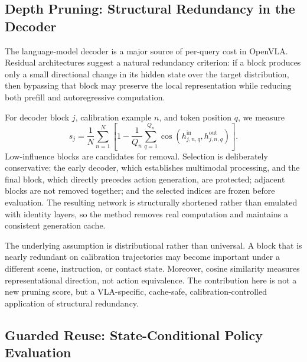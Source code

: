 \documentclass[letterpaper, 10 pt, conference]{ieeeconf}
\begin{document}
\subsection{Depth Pruning: Structural Redundancy in the Decoder}
\label{sec:method_depth_pruning}

The language-model decoder is a major source of per-query cost in OpenVLA.
Residual architectures suggest a natural redundancy criterion: if a block
produces only a small directional change in its hidden state over the target
distribution, then bypassing that block may preserve the local representation
while reducing both prefill and autoregressive computation.

For decoder block $j$, calibration example $n$, and token position $q$, we
measure
\begin{equation}
    s_j=\frac{1}{N}\sum_{n=1}^{N}
        \left[1-\frac{1}{Q_n}\sum_{q=1}^{Q_n}
        \cos\!\left(h^{\mathrm{in}}_{j,n,q},
                    h^{\mathrm{out}}_{j,n,q}\right)\right].
    \label{eq:block_influence}
\end{equation}
Low-influence blocks are candidates for removal. Selection is deliberately
conservative: the early decoder, which establishes multimodal processing, and
the final block, which directly precedes action generation, are protected;
adjacent blocks are not removed together; and the selected indices are frozen
before evaluation. The resulting network is structurally shortened rather
than emulated with identity layers, so the method removes real computation and
maintains a consistent generation cache.

The underlying assumption is distributional rather than universal. A block
that is nearly redundant on calibration trajectories may become important
under a different scene, instruction, or contact state. Moreover, cosine
similarity measures representational direction, not action equivalence.
The contribution here is
not a new pruning score, but a VLA-specific, cache-safe, calibration-controlled
application of structural redundancy.

\subsection{Guarded Reuse: State-Conditional Policy Evaluation}
\label{sec:method_guarded_reuse}
\end{document}
